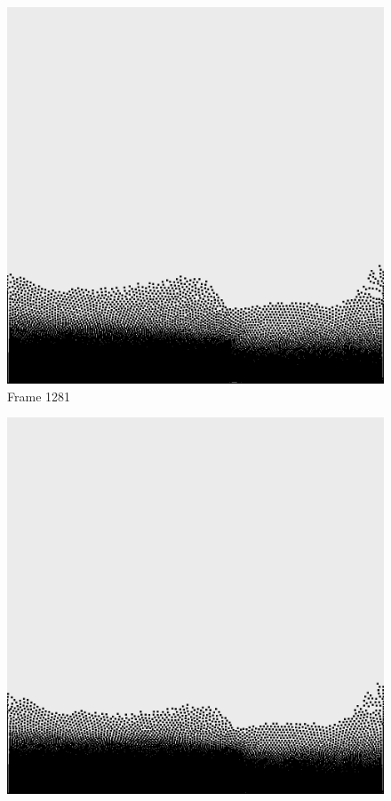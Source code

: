 \documentclass[a4paper, 12pt, oneside]{book}
\begin{document}
\begin{figure}[!ht]
    \addvspace{0.5ex}
        \begin{center}
            \includegraphics[width=\linewidth]{images/test_case_2/1281.png}
            Frame 1281
        \end{center}
    \endminipage
    \hfill
        \begin{center}
            \includegraphics[width=\linewidth]{images/test_case_2/1301.png}

\end{center}
\end{figure}
\end{document}
